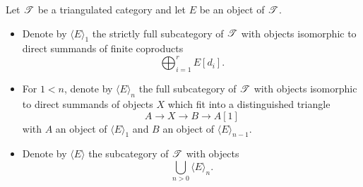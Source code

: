 \documentclass[dissertation.tex]{subfiles}
\begin{document}
\begin{defn}
  Let $\mathscr{T}$ be a triangulated category and let $E$ be an object of $\mathscr{T}$.
  \begin{itemize}
    \item
      Denote by $\langle E \rangle_1$ the strictly full subcategory of $\mathscr{T}$ with objects isomorphic to direct summands of finite coproducts
      $$\bigoplus_{i = 1}^r E[d_i].$$
    \item
      For $1 < n$, denote by $\langle E \rangle_n$ the full subcategory of $\mathscr{T}$ with objects isomorphic to direct summands of objects $X$ which fit into a distinguished triangle
      $$A \rightarrow X \rightarrow B \rightarrow A[1]$$
      with $A$ an object of $\langle E \rangle_1$ and $B$ an object of $\langle E \rangle_{n-1}$.
    \item
      Denote by $\langle E \rangle$ the subcategory of $\mathscr{T}$ with objects
      $$\bigcup_{n>0} \langle E \rangle_n.$$
  \end{itemize}
\end{defn}
\end{document}
